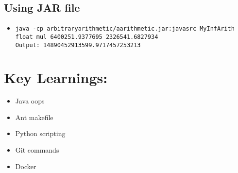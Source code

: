 \documentclass{article}
\begin{document}
\subsection*{Using JAR file}

\begin{itemize}
    \item \texttt{java -cp arbitraryarithmetic/aarithmetic.jar:javasrc MyInfArith float mul 6400251.9377695 2326541.6827934}\\
    \texttt{Output: 14890452913599.9717457253213}
\end{itemize}


\section{Key Learnings:}
\begin{itemize}
    \item Java oops
    \item Ant makefile
    \item Python scripting
    \item Git commands
    \item Docker
\end{itemize}
\end{document}
